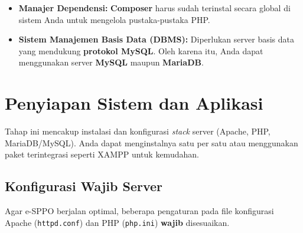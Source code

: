\begin{itemize}
\begin{description}
		\begin{itemize}
			\item Unduh dari: \url{https://pecl.php.net/package/yaml}
			\item Khusus Windows: \url{https://pecl.php.net/package/yaml/2.2.5/windows}
		\end{itemize}
	\end{description}
	\item \textbf{Manajer Dependensi:} \textbf{Composer} harus sudah terinstal secara global di sistem Anda untuk mengelola pustaka-pustaka PHP.
	\item \textbf{Sistem Manajemen Basis Data (DBMS):} Diperlukan server basis data yang mendukung \textbf{protokol MySQL}. Oleh karena itu, Anda dapat menggunakan server \textbf{MySQL} maupun \textbf{MariaDB}.
\end{itemize}

\section{Penyiapan Sistem dan Aplikasi}
\label{sec:penyiapan_aplikasi}
Tahap ini mencakup instalasi dan konfigurasi \textit{stack} server (Apache, PHP, MariaDB/MySQL). Anda dapat menginstalnya satu per satu atau menggunakan paket terintegrasi seperti XAMPP untuk kemudahan.

\subsection{Konfigurasi Wajib Server}

Agar e-SPPO berjalan optimal, beberapa pengaturan pada file konfigurasi Apache (\texttt{httpd.conf}) dan PHP (\texttt{php.ini}) \textbf{wajib} disesuaikan.

